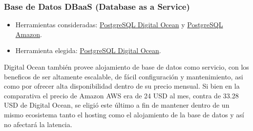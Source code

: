 \subsubsection{Base de Datos DBaaS (Database as a Service)}
\begin{itemize}
\tightlist
\item
  Herramientas consideradas:
  \href{https://www.digitalocean.com/products/managed-databases}{PostgreSQL Digital Ocean} y 
  \href{https://aws.amazon.com/es/rds/)}{PostgreSQL Amazon}.
\item
  Herramienta elegida:   \href{https://www.digitalocean.com/}{PostgreSQL Digital Ocean}.
\end{itemize}
Digital Ocean también provee alojamiento de base de datos como servicio, con los beneficos de ser altamente escalable, de fácil configuración y mantenimiento, asi como por ofrecer alta disponibilidad dentro de su precio mensual.
Si bien en la comparativa el precio de Amazon AWS era de 24 USD al mes, contra de 33.28 USD de Digital Ocean, se eligió este último a fin de mantener dentro de un mismo ecosistema tanto el hosting como el alojamiento de la base de datos y así no afectará la latencia.